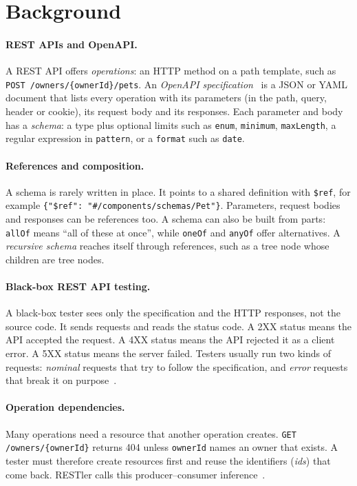 \section{Background}
\label{sec:background}

\paragraph{REST APIs and OpenAPI.} A REST API offers \emph{operations}: an
HTTP method on a path template, such as \texttt{POST /owners/\{ownerId\}/pets}.
An \emph{OpenAPI specification}~\cite{openapi} is a JSON or YAML document that
lists every operation with its parameters (in the path, query, header or
cookie), its request body and its responses. Each parameter and body has a
\emph{schema}: a type plus optional limits such as \texttt{enum},
\texttt{minimum}, \texttt{maxLength}, a regular expression in
\texttt{pattern}, or a \texttt{format} such as \texttt{date}.

\paragraph{References and composition.} A schema is rarely written in place.
It points to a shared definition with \texttt{\$ref}, for example
\texttt{\{"\$ref": "\#/components/schemas/Pet"\}}. Parameters, request bodies
and responses can be references too. A schema can also be built from parts:
\texttt{allOf} means ``all of these at once'', while \texttt{oneOf} and
\texttt{anyOf} offer alternatives. A \emph{recursive schema} reaches itself
through references, such as a tree node whose children are tree nodes.

\paragraph{Black-box REST API testing.} A black-box tester sees only the
specification and the HTTP responses, not the source code. It sends requests
and reads the status code. A 2XX status means the API accepted the request.
A 4XX status means the API rejected it as a client error. A 5XX status means
the server failed. Testers usually run two kinds of requests: \emph{nominal}
requests that try to follow the specification, and \emph{error} requests that
break it on purpose~\cite{resttestgen-stvr}.

\paragraph{Operation dependencies.} Many operations need a resource that
another operation creates. \texttt{GET /owners/\{ownerId\}} returns 404 unless
\texttt{ownerId} names an owner that exists. A tester must therefore create
resources first and reuse the identifiers (\emph{ids}) that come back.
RESTler calls this producer--consumer inference~\cite{restler}.


